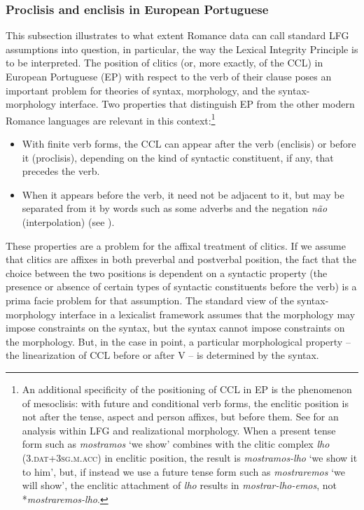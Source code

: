\documentclass[output=paper,hidelinks]{langscibook}
\begin{document}
\subsubsection{Proclisis and enclisis in European Portuguese}
\label{sec:Romance:2.1.3}

This subsection illustrates to what extent Romance data can call standard LFG assumptions into question, in particular, the way the Lexical Integrity Principle is to be interpreted. The position of clitics (or, more exactly, of the CCL) in European Portuguese (EP) with respect to the verb of their clause poses an important problem for theories of syntax, morphology, and the syntax-morphology interface. Two properties that distinguish EP from the other modern Romance languages are relevant in this context:\footnote{An additional specificity of the positioning of CCL in EP is the phenomenon of mesoclisis: with future and conditional verb forms, the enclitic position is not after the tense, aspect and person affixes, but before them. See \citet{LuisSpencer2005} for an analysis within LFG and realizational morphology. When a present tense form such as \textit{mostramos} `we show' combines with the clitic complex \textit{lho} (3.\textsc{dat}+3\textsc{sg.m.acc)} in enclitic position, the result is \textit{mostramos-lho} `we show it to him', but, if instead we use a future tense form such as \textit{mostraremos} `we will show', the enclitic attachment of \textit{lho} results in \textit{mostrar-lho-emos}, not *\textit{mostraremos-lho}.}

\begin{itemize}
\item With finite verb forms, the CCL can appear after the verb (enclisis) or before it (proclisis), depending on the kind of syntactic constituent, if any, that precedes the verb. 
\item When it appears before the verb, it need not be adjacent to it, but may be separated from it by words such as some adverbs and the negation \textit{não} (interpolation) (see ).
\end{itemize}
These properties are a problem for the affixal treatment of clitics. If we assume that clitics are affixes in both preverbal and postverbal position, the fact that the choice between the two positions is dependent on a syntactic property (the presence or absence of certain types of syntactic constituents before the verb) is a prima facie problem for that assumption. The standard view of the syntax-morphology interface in a lexicalist framework assumes that the morphology may impose constraints on the syntax, but the syntax cannot impose constraints on the morphology. But, in the case in point, a particular morphological property -- the linearization of CCL before or after V -- is determined by the syntax.
\end{document}
